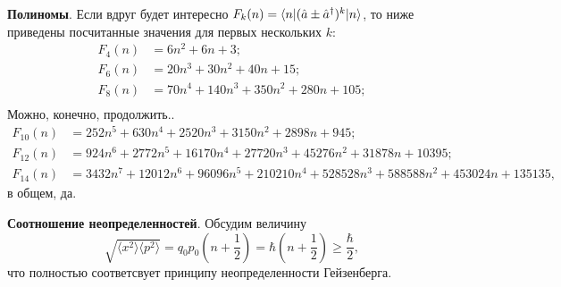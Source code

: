 \textbf{Полиномы}. 
Если вдруг будет интересно $F_k (n) = \bk{n}[(\hat{a} \pm \hat{a}\con)^k]{n}$, то ниже приведены посчитанные значения для первых нескольких $k$:
\begin{align*}
    F_4(n) &= 6 n^2+6 n+3; \\
    F_6(n) &= 20 n^3+30 n^2+40 n+15; \\
    F_8(n) &= 70 n^4+140 n^3+350 n^2+280 n+105; \\
\end{align*}
Можно, конечно, продолжить..
\begin{align*}
    F_{10}(n) &= 252 n^5+630 n^4+2520 n^3+3150 n^2+2898 n+945; \\
    F_{12}(n) &= 924 n^6+2772 n^5+16170 n^4+27720 n^3+45276 n^2+31878 n+10395; \\ 
    F_{14}(n) &= 3432 n^7+12012 n^6+96096 n^5+210210 n^4+528528 n^3+588588 n^2+453024 n+135135,
\end{align*}
в общем, да. 

\textbf{Соотношение неопределенностей}. Обсудим величину
\begin{equation*}
    \sqrt{\langle x^2\rangle \langle p^2\rangle} = q_0 p_0 \left(n + \frac{1}{2}\right)
     =
     \hbar \left(n + \frac{1}{2}\right) \geq \frac{\hbar}{2},
\end{equation*}
что полностью соответсвует принципу  неопределенности Гейзенберга. 